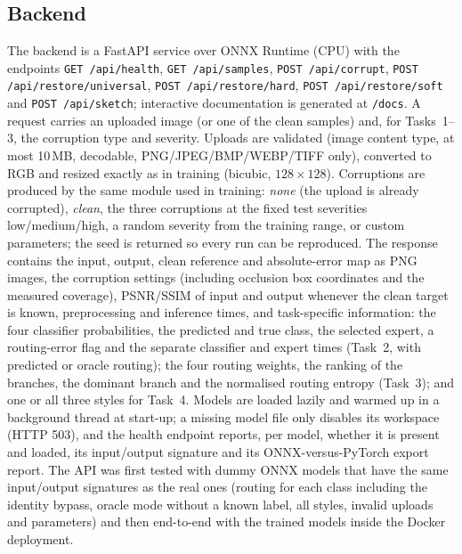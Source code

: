 \documentclass[conference]{IEEEtran}
\begin{document}
\subsection{Backend}
The backend is a FastAPI service over ONNX Runtime (CPU) with the endpoints \texttt{GET /api/health}, \texttt{GET /api/samples}, \texttt{POST /api/corrupt}, \texttt{POST /api/restore/universal}, \texttt{POST /api/restore/hard}, \texttt{POST /api/restore/soft} and \texttt{POST /api/sketch}; interactive documentation is generated at \texttt{/docs}. A request carries an uploaded image (or one of the clean samples) and, for Tasks~1--3, the corruption type and severity. Uploads are validated (image content type, at most 10\,MB, decodable, PNG/JPEG/BMP/WEBP/TIFF only), converted to RGB and resized exactly as in training (bicubic, $128{\times}128$). Corruptions are produced by the same module used in training: \emph{none} (the upload is already corrupted), \emph{clean}, the three corruptions at the fixed test severities low/medium/high, a random severity from the training range, or custom parameters; the seed is returned so every run can be reproduced. The response contains the input, output, clean reference and absolute-error map as PNG images, the corruption settings (including occlusion box coordinates and the measured coverage), PSNR/SSIM of input and output whenever the clean target is known, preprocessing and inference times, and task-specific information: the four classifier probabilities, the predicted and true class, the selected expert, a routing-error flag and the separate classifier and expert times (Task~2, with predicted or oracle routing); the four routing weights, the ranking of the branches, the dominant branch and the normalised routing entropy (Task~3); and one or all three styles for Task~4. Models are loaded lazily and warmed up in a background thread at start-up; a missing model file only disables its workspace (HTTP 503), and the health endpoint reports, per model, whether it is present and loaded, its input/output signature and its ONNX-versus-PyTorch export report. The API was first tested with dummy ONNX models that have the same input/output signatures as the real ones (routing for each class including the identity bypass, oracle mode without a known label, all styles, invalid uploads and parameters) and then end-to-end with the trained models inside the Docker deployment.
\end{document}

